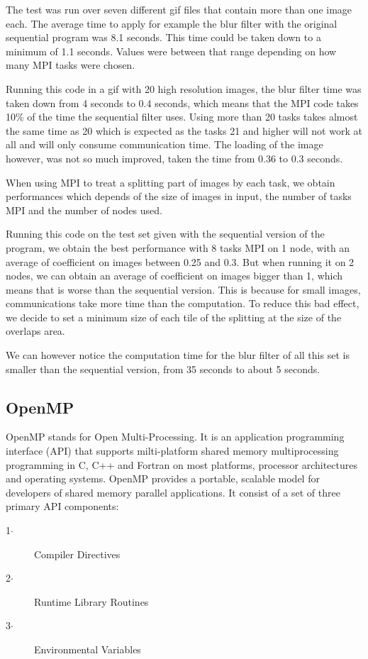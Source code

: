 \documentclass[conference,compsoc]{IEEEtran}
\begin{document}
The test was run over seven different gif files that contain more than one image each. The average time to apply for example the blur filter with the original sequential program was 8.1 seconds. This time could be taken down to a minimum of 1.1 seconds. Values were between that range depending on how many MPI tasks were chosen.

Running this code in a gif with 20 high resolution images, the blur filter time was taken down from 4 seconds to 0.4 seconds, which means that the MPI code takes 10\% of the time the sequential filter uses. Using more than 20 tasks takes almost the same time as 20 which is expected as the tasks 21 and higher will not work at all and will only consume communication time.
The loading of the image however, was not so much improved, taken the time from 0.36 to 0.3 seconds.

When using MPI to treat a splitting part of images by each task, we obtain performances which depends of the size of images in input, the number of tasks MPI and the number of nodes used.

Running this code on the test set given with the sequential version of the program, we obtain the best performance with 8 tasks MPI on 1 node, with an average of coefficient on images between 0.25 and 0.3. But when running it on 2 nodes, we can obtain an average of coefficient on images bigger than 1, which means that is worse than the sequential version. This is because for small images, communications take more time than the computation. To reduce this bad effect, we decide to set a minimum size of each tile of the splitting at the size of the overlaps area.

We can however notice the computation time for the blur filter of all this set is smaller than the sequential version, from 35 seconds to about 5 seconds.

\subsection{OpenMP} \label{sec:OpenMP}
OpenMP stands for Open Multi-Processing. It is an application programming interface (API) that supports milti-platform shared memory multiprocessing programming in C, C++ and Fortran on most platforms, processor architectures and operating systems.
OpenMP provides a portable, scalable model for developers of shared memory parallel applications.
It consist of a set of three primary API components:
\begin{description}
	\item[1$\cdot$] Compiler Directives
	\item[2$\cdot$] Runtime Library Routines
	\item[3$\cdot$] Environmental Variables
\end{description}
\end{document}
